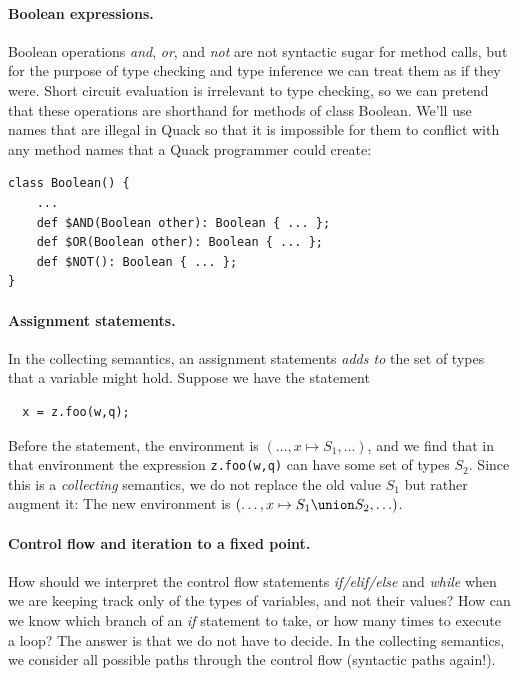 \documentclass[11pt]{article}
\begin{document}
\paragraph{Boolean expressions.}
Boolean operations \emph{and}, \emph{or}, and \emph{not} are not
syntactic sugar for method calls, but for the purpose of type checking
and type inference we can treat them as if they were.  Short circuit
evaluation is irrelevant to type checking, so we can pretend that
these operations are shorthand for methods of class Boolean.  We'll
use names that are illegal in Quack so that it is impossible for them
to conflict with any method names that a Quack programmer could
create: 

\begin{verbatim}
class Boolean() {
    ...
    def $AND(Boolean other): Boolean { ... }; 
    def $OR(Boolean other): Boolean { ... }; 
    def $NOT(): Boolean { ... }; 
}
\end{verbatim}


\paragraph{Assignment statements.}

In the collecting semantics, an assignment statements \emph{adds to}
the set of types that a variable might hold.  Suppose we have the 
statement 
\begin{verbatim}
  x = z.foo(w,q);
\end{verbatim}

Before the statement, the environment is \( ( \ldots , x \mapsto S_1,
\ldots ) \), and we find that in that environment the expression
\verb|z.foo(w,q)| can have some set of types $S_2$.  Since this is a
\emph{collecting} semantics, we do not replace the old value $S_1$ but
rather augment it:  The new environment is 
\( ( \ldots ,  x \mapsto S_1 \union S_2 , \ldots )\). 

\paragraph{Control flow and iteration to a fixed point.}

How should we interpret the control flow statements
\emph{if/elif/else} and \emph{while} when we are keeping track only of
the types of variables, and not their values?   How can we know which
branch of an \emph{if} statement to take, or how many times to execute
a loop?  The answer is that we do not have to decide.  In the
collecting semantics, we consider all possible paths through the
control flow (syntactic paths again!).   
\end{document}
